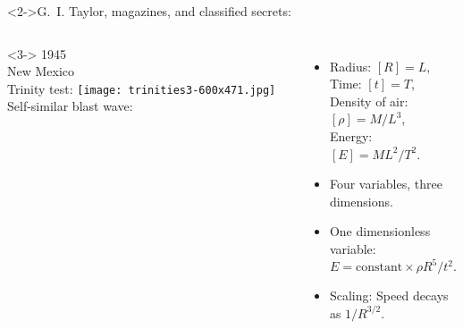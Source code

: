 \begin{frame}
  \small


  \begin{block}<2->{G.\ I. Taylor, magazines, and classified secrets:}
    \begin{columns}<3->
      1945 \\  New Mexico \\ Trinity test:
      \texttt{[image: trinities3-600x471.jpg]}
      Self-similar blast wave:
      \begin{itemize}
      \item<+-> 
        Radius: $[R] = L$, \\
        Time: $[t] = T$,\\
        Density of air: $[\rho]=M/L^{3}$,\\
        Energy: $[E] = ML^{2}/T^{2}$.
      \item<+-> 
        Four variables, three dimensions.
      \item<+-> 
        One dimensionless variable:\\
        $
        E
        = 
        \mbox{constant} \times
        \rho R^5 / t^2.
        $
      \item<+-> 
        Scaling: Speed decays as $1/R^{3/2}$.
      \end{itemize}
    \end{columns}
  \end{block}


\end{frame}

